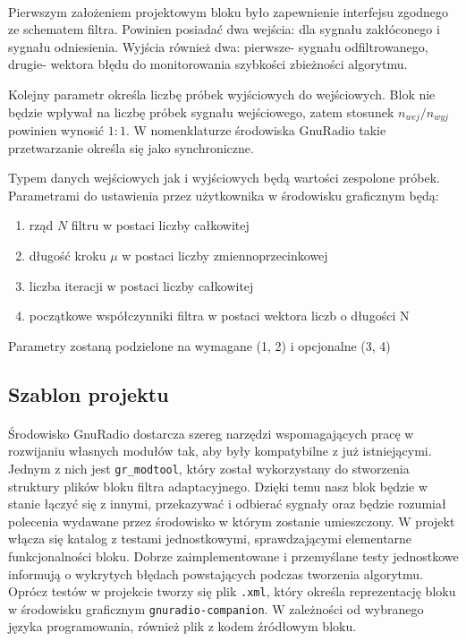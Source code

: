 \paragraph{}
Pierwszym założeniem projektowym bloku było zapewnienie interfejsu zgodnego ze schematem filtra. 
Powinien posiadać dwa wejścia: dla sygnału zakłóconego i sygnału odniesienia. 
Wyjścia również dwa: pierwsze- sygnału odfiltrowanego, drugie- wektora błędu do monitorowania szybkości zbieżności algorytmu.

Kolejny parametr określa liczbę próbek wyjściowych do wejściowych.
Blok nie będzie wpływał na liczbę próbek sygnału wejściowego, zatem stosunek $n_{wej}/n_{wyj}$ powinien wynosić $1:1$. 
W nomenklaturze środowiska GnuRadio takie przetwarzanie określa się jako synchroniczne.

Typem danych wejściowych jak i wyjściowych będą wartości zespolone próbek.
Parametrami do ustawienia przez użytkownika w środowisku graficznym będą:
\begin{enumerate}
 \item rząd $N$ filtru w postaci liczby całkowitej 
 \item długość kroku $\mu$ w postaci liczby zmiennoprzecinkowej
 \item liczba iteracji w postaci liczby całkowitej
 \item początkowe współczynniki filtra w postaci wektora liczb o długości N 
 \end{enumerate}
 
Parametry zostaną podzielone na wymagane (1, 2) i opcjonalne (3, 4)
\subsection{Szablon projektu}
\paragraph{}
Środowisko GnuRadio dostarcza szereg narzędzi wspomagających pracę w rozwijaniu własnych modułów tak, aby były kompatybilne z już istniejącymi. 
Jednym z nich jest \texttt{gr\_modtool}, który został wykorzystany do stworzenia struktury plików bloku filtra adaptacyjnego. 
Dzięki temu nasz blok będzie w stanie łączyć się z innymi, przekazywać i odbierać sygnały oraz będzie rozumiał polecenia wydawane przez środowisko w którym zostanie umieszczony. 
W projekt włącza się katalog z testami jednostkowymi, sprawdzającymi elementarne funkcjonalności bloku. 
Dobrze zaimplementowane i przemyślane testy jednostkowe informują o wykrytych błędach powstających podczas tworzenia algorytmu.
Oprócz testów w projekcie tworzy się plik \texttt{.xml}, który określa reprezentację bloku w środowisku graficznym \texttt{gnuradio-companion}. 
W zależności od wybranego języka programowania, również plik z kodem źródłowym bloku.
